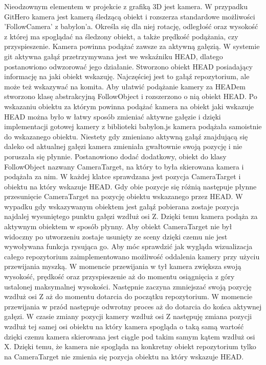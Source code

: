 \documentclass[12pt,a4paper,polish,thesis]{dcsbook}
\begin{document}
{	Nieodzownym elementem w projekcie z grafiką 3D jest kamera. W przypadku GitHero kamera jest kamerą śledzącą obiekt i rozszerza standardowe możliwości 'FollowCamera' z babylon'a. Określa się dla niej rotację, odległość oraz wysokość z której ma spoglądać na śledzony obiekt, a także prędkość podążania, czy przyspieszenie. Kamera powinna podążać zawsze za aktywną gałęzią. W systemie git aktywna gałąź przetrzymywana jest we wskaźniku HEAD, dlatego postanowiono odwzorować jego działanie. Stworzono obiekt HEAD posiadający informację na jaki obiekt wskazuję. Najczęściej jest to gałąź repozytorium, ale może też wskazywać na komita. Aby ułatwić podążanie kamery za HEADem stworzono klasę abstrakcyjną FollowObject i rozszerzono o nią obiekt HEAD. Po wskazaniu obiektu za którym powinna podążać kamera na obiekt jaki wskazuje HEAD można było w łatwy sposób zmieniać aktywne gałęzie i dzięki implementacji gotowej kamery z biblioteki babylon.js kamera podążała samoistnie do wskazanego obiektu. Niestety gdy zmieniano aktywną gałąź znajdującą się daleko od aktualnej gałęzi kamera zmieniała gwałtownie swoją pozycję i nie poruszała się płynnie. Postanowiono dodać dodatkowy, obiekt do klasy FollowObject nazwany CameraTarget, na który to była skierowana kamera i podążała za nim. W każdej klatce sprawdzana jest pozycja CameraTarget i obiektu na który wskazuje HEAD. Gdy obie pozycje się różnią następuje płynne przesunięcie CameraTarget na pozycję obiektu wskazanego przez HEAD. W wypadku gdy wskazywanym obiektem jest gałąź pobierana zostaje pozycja najdalej wysuniętego punktu gałęzi wzdłuż osi Z. Dzięki temu kamera podąża za aktywnym obiektem w sposób płynny. Aby obiekt CameraTarget nie był widoczny po utworzeniu zostaje usunięty ze sceny dzięki czemu nie jest wywoływana funkcja rysująca go. Aby móc sprawdzić jak wygląda wizualizacja całego repozytorium zaimplementowano możliwość oddalenia kamery przy użyciu przewijania myszką. W momencie przewijania w tył kamera zwiększa swoją wysokość, prędkość oraz przyspieszenie aż do momentu osiągnięcia z góry ustalonej maksymalnej wysokości. Następnie zaczyna zmniejszać swoją pozycję wzdłuż osi Z aż do momentu dotarcia do początku repozytorium. W momencie przewijania w przód następuje odwrotny proces aż do dotarcia do końca aktywnej gałęzi. W czasie zmiany pozycji kamery wzdłuż osi Z następuję zmiana pozycji wzdłuż tej samej osi obiektu na który kamera spogląda o taką samą wartość dzięki czemu kamera skierowana jest ciągle pod takim samym kątem wzdłuż osi X. Dzięki temu, że kamera nie spogląda na konkretny obiekt repozytorium tylko na CameraTarget nie zmienia się pozycja obiektu na który wskazuje HEAD.

}
\end{document}
